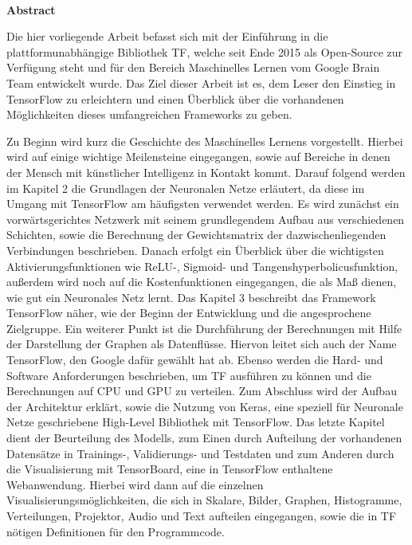 

\newpage{}

~

\vspace{17.1mm}


\noindent \begin{flushleft}
\textbf{\huge{}Abstract}
\par\end{flushleft}{\huge \par}

Die hier vorliegende Arbeit befasst sich mit der Einführung in die plattformunabhängige Bibliothek \gls{TF}, welche seit Ende 2015 als Open-Source zur Verfügung steht und für den Bereich Maschinelles Lernen vom Google Brain Team entwickelt wurde. Das Ziel dieser Arbeit ist es, dem Leser den Einstieg in TensorFlow zu erleichtern und einen Überblick über die vorhandenen Möglichkeiten dieses umfangreichen Frameworks zu geben.

Zu Beginn wird kurz die Geschichte des Maschinelles Lernens vorgestellt. Hierbei wird auf einige wichtige Meilensteine eingegangen, sowie auf Bereiche in denen der Mensch mit künstlicher Intelligenz in Kontakt kommt. Darauf folgend werden im Kapitel 2  die Grundlagen der Neuronalen Netze erläutert, da diese im Umgang mit TensorFlow am häufigsten verwendet werden. Es wird zunächst ein vorwärtsgerichtes Netzwerk mit seinem grundlegendem Aufbau aus verschiedenen Schichten, sowie die Berechnung der Gewichtsmatrix der dazwischenliegenden Verbindungen beschrieben. Danach erfolgt ein Überblick über die wichtigsten  Aktivierungsfunktionen wie ReLU-, Sigmoid- und Tangenshyperbolicusfunktion, außerdem wird noch auf die Kostenfunktionen eingegangen, die als Maß dienen, wie gut ein Neuronales Netz lernt. Das Kapitel 3 beschreibt das Framework TensorFlow näher, wie der Beginn der Entwicklung und die angesprochene Zielgruppe. Ein weiterer Punkt ist die Durchführung der Berechnungen mit Hilfe der Darstellung der Graphen als Datenflüsse. Hiervon leitet sich auch der Name TensorFlow, den Google dafür gewählt hat ab. Ebenso werden die Hard- und Software Anforderungen beschrieben, um TF ausführen zu können und die Berechnungen auf CPU und GPU zu verteilen. Zum Abschluss wird der Aufbau der Architektur erklärt, sowie die Nutzung von Keras, eine speziell für Neuronale Netze geschriebene High-Level Bibliothek mit TensorFlow. Das letzte Kapitel dient der Beurteilung des Modells, zum Einen durch Aufteilung der vorhandenen Datensätze in Trainings-, Validierungs- und Testdaten und zum Anderen durch die Visualisierung mit TensorBoard, eine in TensorFlow enthaltene Webanwendung. Hierbei wird dann auf die einzelnen Visualisierungsmöglichkeiten, die sich in Skalare, Bilder, Graphen, Histogramme, Verteilungen, Projektor, Audio und Text aufteilen eingegangen, sowie die in TF nötigen Definitionen für den Programmcode.  
